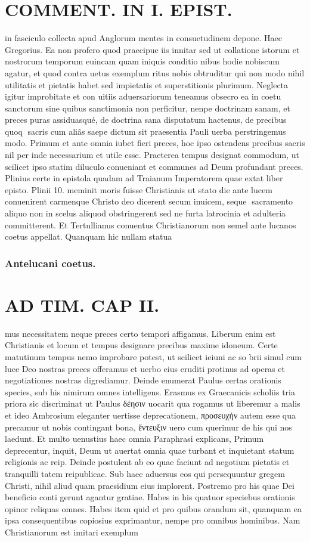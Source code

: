 \documentclass{article}
\begin{document}
\begin{pages}
\section*{COMMENT. IN I. EPIST. }\pstart in fasciculo collecta apud Anglorum mentes in consuetudinem depone. Haec Gregorius. Ea non profero quod praecipue iis innitar sed ut collatione istorum et nostrorum temporum euincam quam iniquis conditio nibus hodie nobiscum agatur, et quod contra uetus exemplum ritus nobis obtruditur qui non modo nihil utilitatis et pietatis habet sed impietatis et superstitionis plurimum. Neglecta igitur improbitate et con uitiis aduersariorum teneamus obsecro ea in coetu sanctorum sine quibus sanctimonia non perficitur, nenpe doctrinam sanam, et preces puras assiduasqué, de doctrina sana disputatum hactenus, de precibus quoq sacris cum aliâs saepe dictum sit praesentia Pauli uerba perstringemus modo. Primum et ante omnia iubet fieri preces, hoc ipso ostendens precibus sacris nil per inde necessarium et utile esse. Praeterea tempus designat commodum, ut scilicet ipso statim diluculo conueniant et communes ad Deum profundant preces. Plinius certe in epistola quadam ad Traianum Imperatorem quae extat liber  episto. Plinii 10. meminit moris fuisse Christianis ut stato die ante lucem conuenirent carmenque Christo deo dicerent secum inuicem, seque sacramento aliquo non in scelus aliquod obstringerent sed ne furta latrocinia et adulteria committerent. Et Tertullianus conuentus Christianorum non semel ante lucanos coetus appellat. Quanquam hic nullam statua\pend
\subsubsection*{Antelucani coetus. }
\section*{AD TIM. CAP II. }
\marginpar{[ p.111 ]}\pstart mus necessitatem neque preces certo tempori affigamus. Liberum enim est Christianis et locum et tempus designare precibus maxime idoneum. Certe matutinum tempus nemo improbare potest, ut scilicet ieiuni ac so brii simul cum luce Deo nostras preces offeramus et uerbo eius eruditi protinus ad operas et negotiationes nostras digrediamur. Deinde enumerat Paulus certas orationis species, sub his nimirum omnes intelligens. Erasmus ex Graecanicis scholiis tria priora sic discriminat ut Paulus δέησιν uocarit qua rogamus ut liberemur a malis et ideo Ambrosium eleganter uertisse deprecationem, προσευχήν autem esse qua precamur ut nobis contingant bona, ἔντευξιν uero cum querimur de his qui nos laedunt. Et multo uenustius haec omnia Paraphrasi explicans, Primum deprecentur, inquit, Deum ut auertat omnia quae turbant et inquietant statum religionis ac reip. Deinde postulent ab eo quae faciunt ad negotium pietatis et tranquilli tatem reipublicae. Sub haec aduersus eos qui persequuntur gregem Christi, nihil aliud quam praesidium eius implorent. Postremo pro his quae Dei beneficio conti gerunt agantur gratiae. Habes in his quatuor speciebus orationis opinor reliquas omnes. Habes item quid et pro quibus orandum sit, quanquam ea ipsa consequentibus copiosius exprimantur, nempe pro omnibus hominibus. Nam Christianorum est imitari exemplum  \pend

\end{pages}
\end{document}
